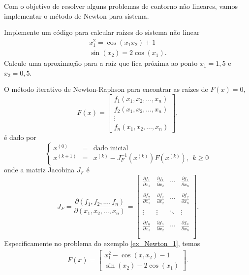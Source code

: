Com o objetivo de resolver alguns problemas de contorno não lineares, vamos implementar o método de Newton para sistema.
\begin{ex}\label{ex_Newton_1} Implemente um código para calcular raízes do sistema não linear
\begin{eqnarray*}
x_1^2=\cos(x_1x_2)+1\\
\sin(x_2)=2\cos(x_1).
\end{eqnarray*}
Calcule uma aproximação para a raíz que fica próxima ao ponto $x_1=1,5$ e $x_2=0,5$.
\end{ex}
O método iterativo de Newton-Raphson para encontrar as raízes de $F(x)=0$, 
$$F(x)=\left[
\begin{array}{c}
f_1(x_1,x_2,\ldots,x_n)\\
f_2(x_1,x_2,\ldots,x_n)\\
\vdots\\
f_n(x_1,x_2,\ldots,x_n)
\end{array}
\right],$$
é dado por
\begin{equation*}
\left\{\begin{array}{rcl}
x^{(0)}&=&\text{dado inicial}\\
x^{(k+1)} &=& x^{(k)}-J_F^{-1}\left(x^{(k)}\right)F(x^{(k)}),~~ k\geq 0
\end{array}\right.  
\end{equation*}
onde a matriz Jacobina $J_F$ é 
$$J_F= \frac{\partial(f_1,f_2,\ldots,f_n)}{\partial(x_1,x_2,\ldots,x_n)}=\left[
\begin{array}{ccccc}
\frac{\partial f_1}{\partial x_1}&\frac{\partial f_1}{\partial x_2}&\cdots&\frac{\partial f_1}{\partial x_n}\\~\\
\frac{\partial f_2}{\partial x_1}&\frac{\partial f_2}{\partial x_2}&\cdots&\frac{\partial f_2}{\partial x_n}\\~\\
\vdots&\vdots&\ddots&\vdots\\~\\
\frac{\partial f_n}{\partial x_1}&\frac{\partial f_n}{\partial x_2}&\cdots&\frac{\partial f_n}{\partial x_n}\\~\\
\end{array}
\right].
$$
Especificamente no problema do exemplo \ref{ex_Newton_1}, temos
\begin{eqnarray*}
F(x)=\left[\begin{array}{c}x_1^2-\cos(x_1x_2)-1\\
\sin(x_2)-2\cos(x_1)\end{array}\right].
\end{eqnarray*}
